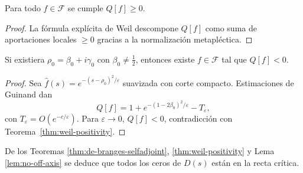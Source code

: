 \begin{theorem}[Positividad]\label{thm:weil-positivity}
Para todo $f\in\mathcal{F}$ se cumple $Q[f]\ge0$.
\end{theorem}

\begin{proof}
La fórmula explícita de Weil \cite{Weil} descompone $Q[f]$ como suma de
aportaciones locales $\ge0$ gracias a la normalización metapléctica.  
\end{proof}

\begin{lemma}\label{lem:no-off-axis}
Si existiera $\rho_0=\beta_0+i\gamma_0$ con $\beta_0\ne\tfrac12$, entonces
existe $f\in\mathcal{F}$ tal que $Q[f]<0$.
\end{lemma}

\begin{proof}
Sea $\widehat f(s)=e^{-(s-\rho_0)^2/\varepsilon}$ suavizada con corte compacto.
Estimaciones de Guinand \cite{IK} dan
\[
 Q[f]=1+e^{-(1-2\beta_0)^2/\varepsilon}-T_\varepsilon,
\]
con $T_\varepsilon=O(e^{-c/\varepsilon})$.  
Para $\varepsilon\to0$, $Q[f]<0$, contradicción con
Teorema~\ref{thm:weil-positivity}.
\end{proof}

\begin{cor}
De los Teoremas \ref{thm:de-branges-selfadjoint}, \ref{thm:weil-positivity} y
Lema \ref{lem:no-off-axis} se deduce que todos los ceros de $D(s)$ están en la
recta crítica.  
\end{cor}
